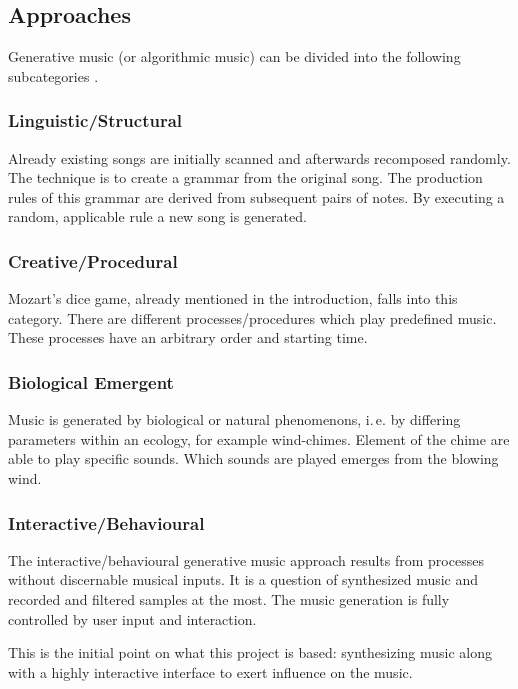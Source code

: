 	\subsection{Approaches} 

	Generative music (or algorithmic music) can be divided into the following subcategories \cite{Wooller2005}.

	\subsubsection{Linguistic/Structural}

	Already existing songs are initially scanned and afterwards recomposed randomly. 
	The technique is to create a grammar from the original song. The production rules of this grammar are derived from subsequent pairs of notes. By executing a random, applicable rule a new song is generated.

	\subsubsection{Creative/Procedural}

	Mozart's dice game, already mentioned in the introduction, falls into this category.
	There are different processes/procedures which play predefined music. These processes have an arbitrary order and starting time. 

	\subsubsection{Biological Emergent}

	Music is generated by biological or natural phenomenons, i.\,e. by differing parameters within an ecology, for example wind-chimes. Element of the chime are able to play specific sounds. Which sounds are played emerges from the blowing wind.

	\subsubsection{Interactive/Behavioural}

	The interactive/behavioural generative music approach results from processes without discernable musical inputs. It is a question of synthesized music and recorded and filtered samples at the most. The music generation is fully controlled by user input and interaction.
	
	This is the initial point on what this project is based: synthesizing music along with a highly interactive interface to exert influence on the music.

